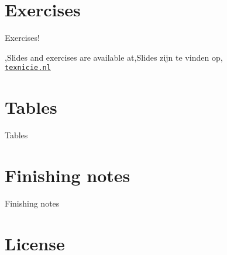 \documentclass[
    english,
    everyoneauthor=true,
    defaultSlideCollection=vincent,
]{../../cursuspresentatie}
\begin{document}
\section{Exercises}
\def\placetarget{\hypertarget{exercises2}{}}

\begin{frame}
    \begin{center}
        {\LARGE Exercises!}
        \vspace{30pt}

        {\Large\lang,Slides and exercises are available at,Slides zijn te vinden op,\\
         \href{https://texnicie.nl}{\ul{\texttt{texnicie.nl}}}}
    \end{center}
\end{frame}


\section{Tables}
\def\placetarget{\hypertarget{tables}{}}

\begin{frame}
    Tables
\end{frame}

\section{Finishing notes}
\def\placetarget{\hypertarget{finishingnotes}{}}

\begin{frame}
    Finishing notes
\end{frame}


\section{License}
    
\end{document}
